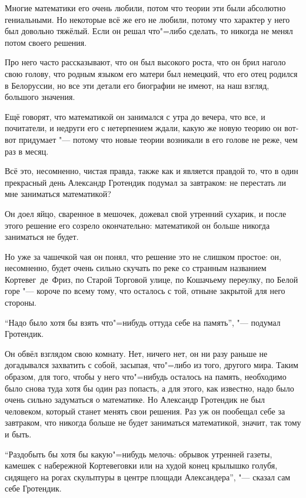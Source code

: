 Многие математики его очень любили, потом что теории эти были абсолютно
гениальными.
Но некоторые всё же его не любили, потому что характер у него был довольно
тяжёлый.
Если он решал что"=либо сделать, то никогда не менял потом своего решения.

Про него часто рассказывают, что он был высокого роста, что он брил наголо свою
голову, что родным языком его матери был немецкий, что его отец родился в
Белоруссии, но все эти детали его биографии не имеют, на наш взгляд, большого
значения.

Ещё говорят, что математикой он занимался с утра до вечера, что все, и
почитатели, и недруги его с нетерпением ждали, какую же новую теорию он вот-вот
придумает "--- потому что новые теории возникали в его голове не реже, чем раз в
месяц.

Всё это, несомненно, чистая правда, также как и является правдой то, что в один
прекрасный день Александр Гротендик подумал за завтраком:
не перестать ли мне заниматься математикой?

Он доел яйцо, сваренное в мешочек, дожевал свой утренний сухарик, и после этого
решение его созрело окончательно: математикой он больше никогда заниматься не
будет.

Но уже за чашечкой чая он понял, что решение это не слишком простое: он,
несомненно, будет очень сильно скучать по реке со странным названием
Кортевег~де~Фриз, по Старой Торговой улице, по Кошачьему переулку, по Белой горе
"--- короче по всему тому, что осталось с той, отныне закрытой для него стороны.

\enquote{Надо было хотя бы взять что"=нибудь оттуда себе на память},
"--- подумал Гротендик.

Он обвёл взглядом свою комнату.
Нет, ничего нет, он ни разу раньше не догадывался захватить с собой, засыпая,
что"=либо из того, другого мира.
Таким образом, для того, чтобы у него что"=нибудь осталось на память, необходимо
было снова туда хотя бы один раз попасть, а для этого, как известно, надо было
очень сильно задуматься о математике.
Но Александр Гротендик не был человеком, который станет менять свои решения.
Раз уж он пообещал себе за завтраком, что никогда больше не будет заниматься
математикой, значит, так тому и быть.

\enquote{Раздобыть бы хотя бы какую"=нибудь мелочь: обрывок утренней газеты,
камешек с набережной Кортевеговки или на худой конец крылышко голубя, сидящего
на рогах скульптуры в центре площади Александера}, "--- сказал сам себе Гротендик.

